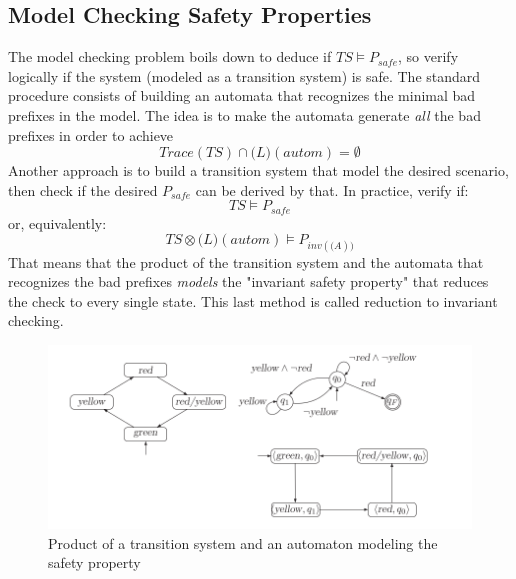 \documentclass{article}
\begin{document}
			\subsection{Model Checking Safety Properties}
				The model checking problem boils down to deduce if $TS \models P_{safe}$, so verify logically if the system (modeled as a transition system) is safe. The standard procedure consists of building an automata that recognizes the minimal bad prefixes in the model. The idea is to make the automata generate \emph{all} the bad prefixes in order to achieve
				\begin{equation}
					Trace(TS) \cap \mathcal(L)(autom) = \emptyset
				\end{equation}
				Another approach is to build a transition system that model the desired scenario, then check if the desired $P_{safe}$ can be derived by that. In practice, verify if:
				\begin{equation}
					TS \models P_{safe}
				\end{equation}
				or, equivalently:
				\begin{equation}
					TS \otimes \mathcal(L)(autom) \models P_{inv(\mathcal(A))}
				\end{equation}
				That means that the product of the transition system and the automata that recognizes the bad prefixes \emph{models} the "invariant safety property" that reduces the check to every single state. This last method is called reduction to invariant checking.
				\begin{figure}[H]
					\centering
					\includegraphics[width = \textwidth]{./images/TSProduct.png}
					\caption{Product of a transition system and an automaton modeling the safety property}
				\end{figure}
				
\end{document}
